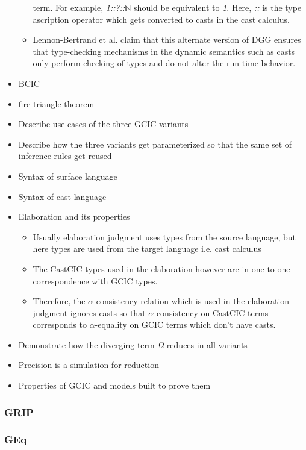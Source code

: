 \documentclass{article}
\newcommand{\Gcode}[1]{{\color{OliveGreen}\textit{#1}}}
\newcommand{\Ccode}[1]{{\color{BlueViolet}\textbf{#1}}}
\begin{document}
\begin{itemize}
\begin{itemize}
        term. For example, \Gcode{1::?::\(\mathbb{N}\)} should be equivalent to
        \Gcode{1}. Here, \Gcode{::} is the type ascription operator which gets
        converted to casts in the cast calculus.
      \item Lennon-Bertrand et al. claim that this alternate version of DGG ensures
        that type-checking mechanisms in the dynamic semantics such as casts only
        perform checking of types and do not alter the run-time behavior.
    \end{itemize}
  \item BCIC
  \item fire triangle theorem
  \item Describe use cases of the three GCIC variants
  \item Describe how the three variants get parameterized so that the same set
    of inference rules get reused
  \item Syntax of surface language
  \item Syntax of cast language
  \item Elaboration and its properties
    \begin{itemize}
      \item Usually elaboration judgment uses types from the source language,
        but here types are used from the target language i.e. cast calculus
      \item The CastCIC types used in the elaboration however are in one-to-one correspondence with GCIC types.
      \item Therefore, the \(\alpha\)-consistency relation which is used in the
        elaboration judgment ignores casts so that \(\alpha\)-consistency on
        CastCIC terms corresponds to \(\alpha\)-equality on GCIC terms which
        don't have casts.
    \end{itemize}
  \item Demonstrate how the diverging term \Ccode{\(\Omega\)} reduces in all variants
  \item Precision is a simulation for reduction
  \item Properties of GCIC and models built to prove them
\end{itemize}

\subsubsection{GRIP}
\subsubsection{GEq}
\end{document}
